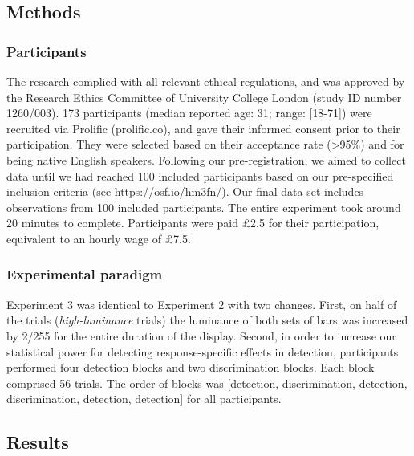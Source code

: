 \documentclass[12pt,twoside]{reedthesis}
\begin{document}
\hypertarget{methods-2}{%
\subsection{Methods}\label{methods-2}}

\hypertarget{participants-6}{%
\subsubsection{Participants}\label{participants-6}}

The research complied with all relevant ethical regulations, and was approved by the Research Ethics Committee of University College London (study ID number 1260/003). 173 participants (median reported age: 31; range: {[}18-71{]}) were recruited via Prolific (prolific.co), and gave their informed consent prior to their participation. They were selected based on their acceptance rate (\textgreater95\%) and for being native English speakers. Following our pre-registration, we aimed to collect data until we had reached 100 included participants based on our pre-specified inclusion criteria (see \url{https://osf.io/hm3fn/}). Our final data set includes observations from 100 included participants. The entire experiment took around 20 minutes to complete. Participants were paid £2.5 for their participation, equivalent to an hourly wage of £7.5.

\hypertarget{experimental-paradigm-1}{%
\subsubsection{Experimental paradigm}\label{experimental-paradigm-1}}

Experiment 3 was identical to Experiment 2 with two changes. First, on half of the trials (\emph{high-luminance} trials) the luminance of both sets of bars was increased by 2/255 for the entire duration of the display. Second, in order to increase our statistical power for detecting response-specific effects in detection, participants performed four detection blocks and two discrimination blocks. Each block comprised 56 trials. The order of blocks was {[}detection, discrimination, detection, discrimination, detection, detection{]} for all participants.

\hypertarget{results-6}{%
\subsection{Results}\label{results-6}}
\end{document}
